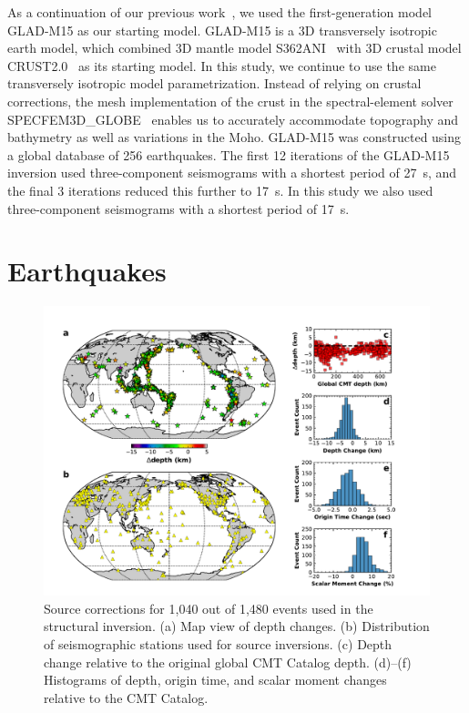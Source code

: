 \documentclass[extra,mreferee]{gji}
\begin{document}
As a continuation of our previous work~\citep{bozdaug2016global},
we used the first-generation model GLAD-M15 as our
starting model.
GLAD-M15 is a 3D transversely isotropic earth model, which combined
3D mantle model S362ANI~\citep{kustowski2008anisotropic}
with 3D crustal model CRUST2.0~\citep{bassin2000current} as its starting model.
In this study,
we continue to use the same transversely isotropic model parametrization.
Instead of relying on crustal corrections,
the mesh implementation of the crust in the spectral-element solver SPECFEM3D\_GLOBE~\citep{KoTr02a,KoTr02b,PeKoLuMaLeCaLeMaLiBlNiBaTr11} enables us to accurately accommodate topography and bathymetry as well as variations in the Moho.
GLAD-M15 was constructed using a global database of 256 earthquakes.
The first 12 iterations of the GLAD-M15 inversion used three-component seismograms with a shortest period of 27~s,
and the final 3 iterations reduced this further to 17~s.
In this study we also used three-component seismograms with a shortest period of 17~s.

\section{Earthquakes}
\label{section:earthquakes}

\begin{figure}
  \centering
  \includegraphics[width=\textwidth]{figures/source_corrections.pdf}
  \caption{\small{Source corrections for 1,040 out of 1,480 events used in the structural inversion. (a) Map view of depth changes. (b) Distribution of seismographic stations used for source inversions. (c) Depth change relative to the original global CMT Catalog depth. (d)--(f) Histograms of depth, origin time, and scalar moment changes relative to the CMT Catalog.
  }}
  \label{fig:source_correction}
\end{figure}
\end{document}
